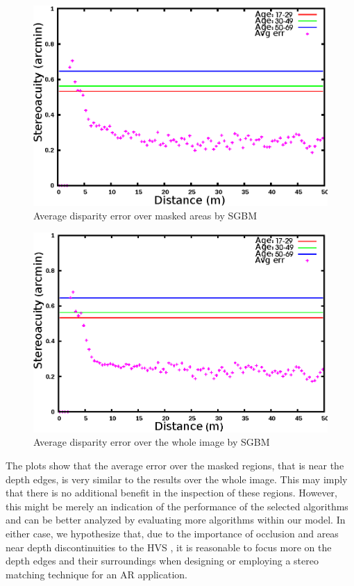 \begin{figure}[H]
\centering
\includegraphics[scale=0.95]{sgbmmsk3}
\caption{Average disparity error over masked areas by SGBM}
\label{fig:sgbmmsk3}
\end{figure} 
\begin{figure}[H]
\centering
\includegraphics[scale=0.95]{sgbmfull3}
\caption{Average disparity error over the whole image by SGBM}
\label{fig:sgbmfull3}
\end{figure} 

The plots show that the average error over the masked regions, that is near the depth edges, is very similar to the results over the whole image. 
This may imply that there is no additional benefit in the inspection of these regions. 
However, this might be merely an indication of the performance of the selected algorithms and can be better analyzed by evaluating more algorithms 
within our model.
In either case, we hypothesize that, due to the importance of occlusion and areas near depth discontinuities to the HVS \cite{sze11},
it is reasonable to focus more on the depth edges and their surroundings when designing or employing a stereo matching technique for an AR application.

